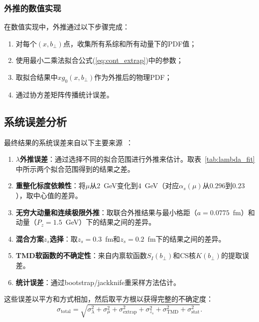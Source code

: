 \documentclass[12pt,a4paper]{ctexart}
\theoremstyle{definition}
\newcommand{\Pz}{P_z}
\newcommand{\alphas}{\alpha_s}
\newcommand{\bperp}{b_\perp}
\begin{document}
\subsubsection{外推的数值实现}

在数值实现中，外推通过以下步骤完成：
\begin{enumerate}
    \item 对每个$(x, \bperp)$点，收集所有系综和所有动量下的PDF值；
    \item 使用最小二乘法拟合公式(\ref{eq:cont_extrap})中的参数；
    \item 取拟合结果中$xg_0(x, \bperp)$作为外推后的物理PDF；
    \item 通过协方差矩阵传播统计误差。
\end{enumerate}

\subsection{系统误差分析}

最终结果的系统误差来自以下主要来源~\cite{Chen2025gluon}：

\begin{enumerate}[label=(\arabic*), leftmargin=*]
    \item \textbf{$\lambda$外推误差}：通过选择不同的拟合范围进行外推来估计。取表~\ref{tab:lambda_fit}中所示两个拟合范围得到的结果之差。
    \item \textbf{重整化标度依赖性}：将$\mu$从$2$~GeV变化到$4$~GeV（对应$\alphas(\mu)$从$0.296$到$0.23$），取中心值的差异。
    \item \textbf{无穷大动量和连续极限外推}：取联合外推结果与最小格距（$a = 0.0775$~fm）和动量（$\Pz = 1.5$~GeV）下的结果之间的差异。
    \item \textbf{混合方案$z_s$选择}：取$z_s = 0.3$~fm和$z_s = 0.2$~fm下的结果之间的差异。
    \item \textbf{TMD软函数的不确定性}：来自内禀软函数$S_I(\bperp)$和CS核$K(\bperp)$的提取误差。
    \item \textbf{统计误差}：通过bootstrap/jackknife重采样方法估计。
\end{enumerate}

这些误差以平方和方式相加，然后取平方根以获得完整的不确定度：
\begin{equation}\label{eq:total_error}
    \sigma_{\text{total}} = \sqrt{\sigma_{\lambda}^2 + \sigma_{\mu}^2 + \sigma_{\text{extrap}}^2 + \sigma_{z_s}^2 + \sigma_{\text{TMD}}^2 + \sigma_{\text{stat}}^2}.
\end{equation}
\end{document}
